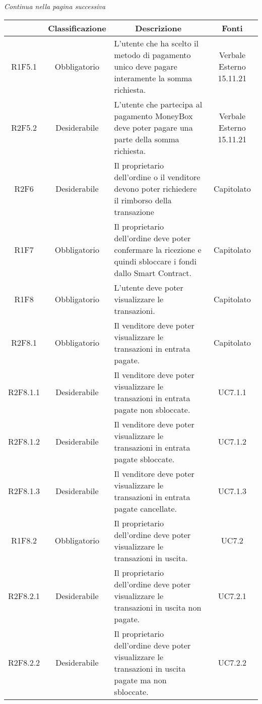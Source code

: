 \begin{center}
    \textit{\small Continua nella pagina successiva}
\end{center}
\begin{table}[H]
    \centering
    \renewcommand{\arraystretch}{1.8}
    \begin{tabular}{c | c | p{6cm} | c}
        \rowcolor[HTML]{125E28} 
        \multicolumn{1}{c}{\color[HTML]{FFFFFF} \textbf{Codice}} & 
		\multicolumn{1}{c}{\color[HTML]{FFFFFF} \textbf{Classificazione}} & 
		\multicolumn{1}{c}{\color[HTML]{FFFFFF} \textbf{Descrizione}} & 
		\multicolumn{1}{c}{\color[HTML]{FFFFFF} \textbf{Fonti}} \\
        \hline
        R1F5.1 & Obbligatorio & L'utente che ha scelto il metodo di pagamento unico deve pagare interamente la somma richiesta. & Verbale Esterno 15.11.21 \\
        R2F5.2 & Desiderabile & L'utente che partecipa al pagamento MoneyBox deve poter pagare una parte della somma richiesta. & Verbale Esterno 15.11.21 \\
        R2F6 & Desiderabile & Il proprietario dell'ordine o il venditore devono poter richiedere il rimborso della transazione  & Capitolato \\
        R1F7 & Obbligatorio & Il proprietario dell'ordine deve poter confermare la ricezione e quindi sbloccare i fondi dallo Smart Contract. & Capitolato \\
        R1F8 & Obbligatorio & L'utente deve poter visualizzare le transazioni. & Capitolato \\
        R2F8.1 & Obbligatorio & Il venditore deve poter visualizzare le transazioni in entrata pagate. & Capitolato \\
        R2F8.1.1 & Desiderabile & Il venditore deve poter visualizzare le transazioni in entrata pagate non sbloccate. & UC7.1.1 \\
        R2F8.1.2 & Desiderabile & Il venditore deve poter visualizzare le transazioni in entrata pagate sbloccate. & UC7.1.2 \\
        R2F8.1.3 & Desiderabile & Il venditore deve poter visualizzare le transazioni in entrata pagate cancellate. & UC7.1.3 \\
        R1F8.2 & Obbligatorio & Il proprietario dell'ordine deve poter visualizzare le transazioni in uscita. & UC7.2 \\
        R2F8.2.1 & Desiderabile & Il proprietario dell'ordine deve poter visualizzare le transazioni in uscita non pagate. & UC7.2.1 \\
        R2F8.2.2 & Desiderabile & Il proprietario dell'ordine deve poter visualizzare le transazioni in uscita pagate ma non sbloccate. & UC7.2.2 \\
    \end{tabular}
\end{table}
